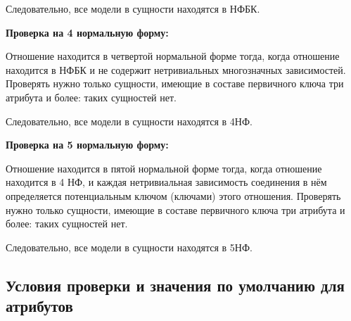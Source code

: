 Следовательно, все модели в сущности находятся в НФБК.

{\bf Проверка на 4 нормальную форму:}

Отношение находится в четвертой нормальной форме тогда, когда отношение находится в НФБК и не содержит нетривиальных многозначных зависимостей.
Проверять нужно только сущности, имеющие в составе первичного ключа три атрибута и более: таких сущностей нет.


Следовательно, все модели в сущности находятся в 4НФ.

{\bf Проверка на 5 нормальную форму:}

Отношение находится в пятой нормальной форме тогда, когда отношение находится в 4 НФ, и каждая нетривиальная зависимость соединения в нём определяется потенциальным ключом (ключами) этого отношения.
Проверять нужно только сущности, имеющие в составе первичного ключа три атрибута и более: таких сущностей нет.

Следовательно, все модели в сущности находятся в 5НФ.

\subsection{Условия проверки и значения по умолчанию для атрибутов}

